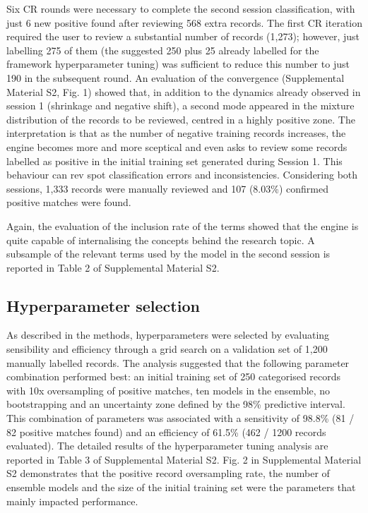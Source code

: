 \documentclass[]{bmcart}
\begin{document}
Six CR rounds were necessary to complete the second session
classification, with just 6 new positive found after reviewing 568 extra
records. The first CR iteration required the user to review a
substantial number of records (1,273); however, just labelling 275 of
them (the suggested 250 plus 25 already labelled for the framework
hyperparameter tuning) was sufficient to reduce this number to just 190
in the subsequent round. An evaluation of the convergence (Supplemental
Material S2, Fig. 1) showed that, in addition to the dynamics already
observed in session 1 (shrinkage and negative shift), a second mode
appeared in the mixture distribution of the records to be reviewed,
centred in a highly positive zone. The interpretation is that as the
number of negative training records increases, the engine becomes more
and more sceptical and even asks to review some records labelled as
positive in the initial training set generated during Session 1. This
behaviour can rev spot classification errors and inconsistencies.
Considering both sessions, 1,333 records were manually reviewed and 107
(8.03\%) confirmed positive matches were found.

Again, the evaluation of the inclusion rate of the terms showed that the
engine is quite capable of internalising the concepts behind the
research topic. A subsample of the relevant terms used by the model in
the second session is reported in Table 2 of Supplemental Material S2.

\subsection*{Hyperparameter selection}

As described in the methods, hyperparameters were selected by evaluating
sensibility and efficiency through a grid search on a validation set of
1,200 manually labelled records. The analysis suggested that the
following parameter combination performed best: an initial training set
of 250 categorised records with 10x oversampling of positive matches,
ten models in the ensemble, no bootstrapping and an uncertainty zone
defined by the 98\% predictive interval. This combination of parameters
was associated with a sensitivity of 98.8\% (81 / 82 positive matches
found) and an efficiency of 61.5\% (462 / 1200 records evaluated). The
detailed results of the hyperparameter tuning analysis are reported in
Table 3 of Supplemental Material S2. Fig. 2 in Supplemental Material S2
demonstrates that the positive record oversampling rate, the number of
ensemble models and the size of the initial training set were the
parameters that mainly impacted performance.
\end{document}
